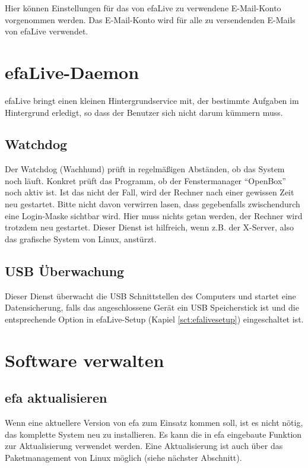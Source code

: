 \documentclass[a4paper,12pt,twoside]{article}
\begin{document}
Hier können Einstellungen für das von efaLive zu verwendene E-Mail-Konto
vorgenommen werden. Das E-Mail-Konto wird für alle zu versendenden E-Mails
von efaLive verwendet.


\section{efaLive-Daemon}
\label{sct:efalivedaemon}
efaLive bringt einen kleinen Hintergrundservice mit, der bestimmte
Aufgaben im Hintergrund erledigt, so dass der Benutzer sich nicht
darum kümmern muss.


\subsection{Watchdog}
\label{sct:watchdog}
Der Watchdog (Wachhund) prüft in regelmäßigen Abständen, ob das System
noch läuft. Konkret prüft das Programm, ob der Fenstermanager "`OpenBox"'
noch aktiv ist. Ist das nicht der Fall, wird der Rechner nach einer gewissen
Zeit neu gestartet. Bitte nicht davon verwirren lasen, dass gegebenfalls
zwischendurch eine Login-Maske sichtbar wird. Hier muss nichts getan werden,
der Rechner wird trotzdem neu gestartet.
Dieser Dienst ist hilfreich, wenn z.B. der X-Server, also das grafische
System von Linux, anstürzt.


\subsection{USB Überwachung}
\label{sct:usb_monitor}
Dieser Dienst überwacht die USB Schnittstellen des Computers und startet
eine Datensicherung, falls das angeschlossene Gerät ein USB Speicherstick
ist und die entsprechende Option in efaLive-Setup (Kapiel \ref{sct:efalivesetup})
eingeschaltet ist.


\section{Software verwalten}
\label{sct:software_verwalten}
\subsection{efa aktualisieren}
\label{update_efa}
Wenn eine aktuellere Version von efa zum Einsatz kommen soll, ist es
nicht nötig, das komplette System neu zu installieren. Es kann die in
efa eingebaute Funktion zur Aktualisierung verwendet werden. Eine 
Aktualisierung ist auch über das Paketmanagement von Linux möglich (siehe
nächster Abschnitt).
\end{document}
